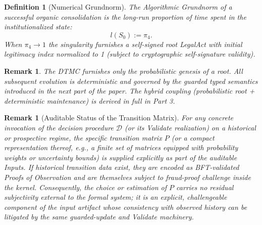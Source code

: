 \documentclass[11pt,a4paper]{article}
\newtheorem{definition}[theorem]{Definition}
\newtheorem{remark}[theorem]{Remark}
\begin{document}
\begin{definition}[Numerical Grundnorm]
The \emph{Algorithmic Grundnorm} of a successful organic consolidation is the long-run proportion of time spent in the institutionalized state:
\[
l(S_0) := \pi_4.
\]
When \(\pi_4 \to 1\) the singularity furnishes a self-signed root LegalAct with initial legitimacy index normalized to 1 (subject to cryptographic self-signature validity).
\end{definition}

\begin{remark}
The DTMC furnishes only the \emph{probabilistic genesis} of a root. All subsequent evolution is deterministic and governed by the guarded typed semantics introduced in the next part of the paper. The hybrid coupling (probabilistic root + deterministic maintenance) is derived in full in Part 3.
\end{remark}

\begin{remark}[Auditable Status of the Transition Matrix]
For any concrete invocation of the decision procedure \(\mathcal{D}\) (or its Validate realization) on a historical or prospective regime, the specific transition matrix \(P\) (or a compact representation thereof, e.g., a finite set of matrices equipped with probability weights or uncertainty bounds) is supplied explicitly as part of the auditable Inputs. If historical transition data exist, they are encoded as BFT-validated Proofs of Observation and are themselves subject to fraud-proof challenge inside the kernel. Consequently, the choice or estimation of \(P\) carries no residual subjectivity external to the formal system; it is an explicit, challengeable component of the input artifact whose consistency with observed history can be litigated by the same guarded-update and Validate machinery.
\end{remark}
\end{document}
